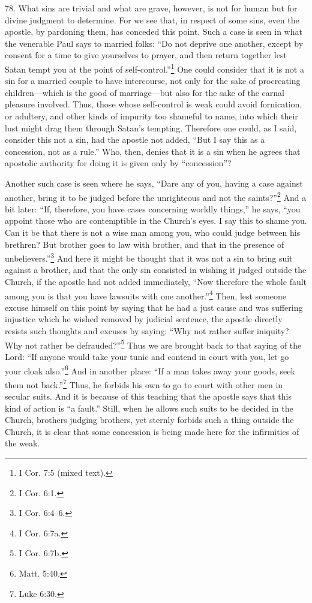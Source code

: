 
78. What sins are trivial and what are grave, however, is not for human but for divine judgment to determine. For we see that, in respect of some sins, even the apostle, by pardoning them, has conceded this point. Such a case is seen in what the venerable Paul says to married folks: ``Do not deprive one another, except by consent for a time to give yourselves to prayer, and then return together lest Satan tempt you at the point of self-control.''\footnote{I Cor. 7:5 (mixed text).} One could consider that it is not a sin for a married couple to have intercourse, not only for the sake of procreating children—which is the good of marriage—but also for the sake of the carnal pleasure involved. Thus, those whose self-control is weak could avoid fornication, or adultery, and other kinds of impurity too shameful to name, into which their lust might drag them through Satan's tempting. Therefore one could, as I said, consider this not a sin, had the apostle not added, ``But I say this as a concession, not as a rule.'' Who, then, denies that it is a sin when he agrees that apostolic authority for doing it is given only by ``concession''?

Another such case is seen where he says, ``Dare any of you, having a case against another, bring it to be judged before the unrighteous and not the saints?''\footnote{I Cor. 6:1.} And a bit later: ``If, therefore, you have cases concerning worldly things,'' he says, ``you appoint those who are contemptible in the Church's eyes. I say this to shame you. Can it be that there is not a wise man among you, who could judge between his brethren? But brother goes to law with brother, and that in the presence of unbelievers.''\footnote{I Cor. 6:4–6.} And here it might be thought that it was not a sin to bring suit against a brother, and that the only sin consisted in wishing it judged outside the Church, if the apostle had not added immediately, ``Now therefore the whole fault among you is that you have lawsuits with one another.''\footnote{I Cor. 6:7a.} Then, lest someone excuse himself on this point by saying that he had a just cause and was suffering injustice which he wished removed by judicial sentence, the apostle directly resists such thoughts and excuses by saying: ``Why not rather suffer iniquity? Why not rather be defrauded?''\footnote{I Cor. 6:7b.} Thus we are brought back to that saying of the Lord: ``If anyone would take your tunic and contend in court with you, let go your cloak also.''\footnote{Matt. 5:40.} And in another place: ``If a man takes away your goods, seek them not back.''\footnote{Luke 6:30.} Thus, he forbids his own to go to court with other men in secular suits. And it is because of this teaching that the apostle says that this kind of action is ``a fault.'' Still, when he allows such suits to be decided in the Church, brothers judging brothers, yet sternly forbids such a thing outside the Church, it is clear that some concession is being made here for the infirmities of the weak.

